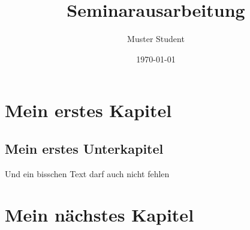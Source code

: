 \documentclass[12pt]{article}
\title{Seminarausarbeitung}
\author {Muster Student}
\date{ \today}
\begin{document}
\maketitle
\newpage

\tableofcontents

\newpage

\section{Mein erstes Kapitel}

\subsection{Mein erstes Unterkapitel}

Und ein bisschen Text darf auch nicht fehlen \cite{macklin2013position}

\section{Mein nächstes Kapitel}


\newpage


\end{document}
